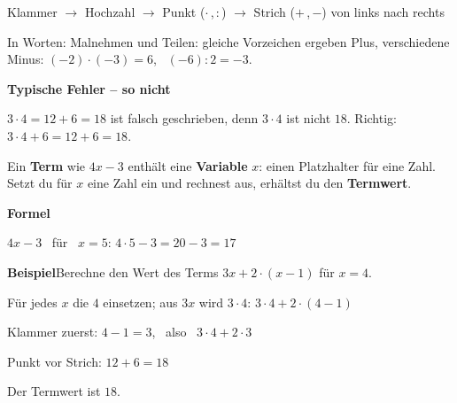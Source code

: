\documentclass[11pt]{article}
\newcommand{\nr}[1]{\makebox[7mm][l]{\textbf{#1}}}
\begin{document}
\begin{tcolorbox}[colback=mbkasten,colframe=mbgrau,boxrule=0.5pt,arc=1mm,left=3mm,right=3mm,top=2mm,bottom=2mm,title={\bfseries Formel auf einen Blick},coltitle=black,colbacktitle=black!10]
{\Large Klammer $\to$ Hochzahl $\to$ Punkt ($\cdot$\,,\,$:$) $\to$ Strich ($+$\,,\,$-$) von links nach rechts}\par\medskip
In Worten: Malnehmen und Teilen: gleiche Vorzeichen ergeben Plus, verschiedene Minus: $(-2) \cdot (-3) = 6$, \ $(-6) : 2 = -3$.\par\medskip
\end{tcolorbox}
\medskip\noindent\textbf{Typische Fehler – so nicht}\par\smallskip
\noindent\nr{$\times$}$3 \cdot 4 = 12 + 6 = 18$ ist falsch geschrieben, denn $3 \cdot 4$ ist nicht $18$. Richtig: $3 \cdot 4 + 6 = 12 + 6 = 18$.\par
\clearpage\label{s:A}\noindent\colorbox{black!12}{}\hspace{3mm}{\Large\bfseries Zahl einsetzen und ausrechnen}\par\smallskip
\noindent Ein \textbf{Term} wie $4x - 3$ enthält eine \textbf{Variable} $x$: einen Platzhalter für eine Zahl. Setzt du für $x$ eine Zahl ein und rechnest aus, erhältst du den \textbf{Termwert}.\par\medskip
\noindent\textbf{Formel}\par\nopagebreak\noindent\hspace*{4mm}\begin{minipage}{\dimexpr\linewidth-4mm\relax}$4x - 3$ \ für \ $x = 5$: \quad $4 \cdot 5 - 3 = 20 - 3 = 17$\end{minipage}\par\medskip
\noindent\textbf{Beispiel}\quad Berechne den Wert des Terms $3x + 2 \cdot (x - 1)$ für $x = 4$.\par\smallskip
\noindent\par\noindent{}Für jedes $x$ die $4$ einsetzen; aus $3x$ wird $3 \cdot 4$: \quad $3 \cdot 4 + 2 \cdot (4 - 1)$\par\smallskip\par\noindent{}Klammer zuerst: \quad $4 - 1 = 3$, \ also \ $3 \cdot 4 + 2 \cdot 3$\par\smallskip\par\noindent{}Punkt vor Strich: \quad $12 + 6 = 18$\par\smallskip\par\noindent{}Der Termwert ist $18$.\par\smallskip\par\medskip
\end{document}
